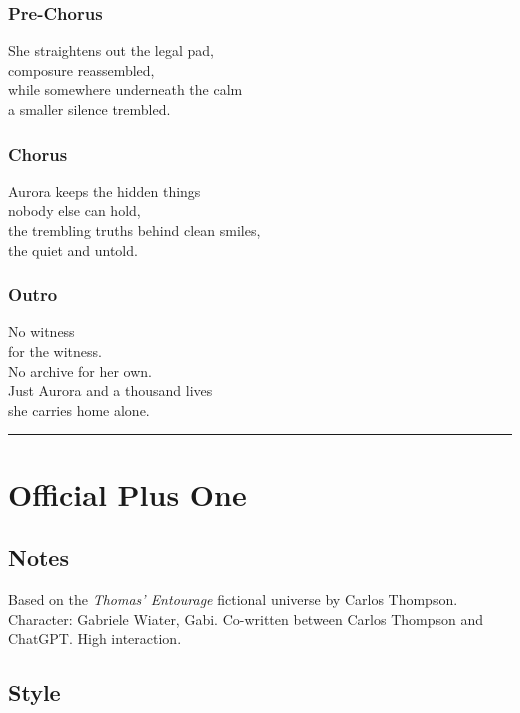 \subsubsection{Pre-Chorus}\label{pre-chorus-16}

She straightens out the legal pad,\\
composure reassembled,\\
while somewhere underneath the calm\\
a smaller silence trembled.

\subsubsection{Chorus}\label{chorus-26}

Aurora keeps the hidden things\\
nobody else can hold,\\
the trembling truths behind clean smiles,\\
the quiet and untold.

\subsubsection{Outro}\label{outro-2}

No witness\\
for the witness.\\
No archive for her own.\\
Just Aurora and a thousand lives\\
she carries home alone.

\begin{center}\rule{0.5\linewidth}{0.5pt}\end{center}

\section{Official Plus One}\label{official-plus-one}

\subsection{Notes}\label{notes-13}

Based on the \emph{Thomas' Entourage} fictional universe by Carlos
Thompson. Character: Gabriele Wiater, Gabi. Co-written between Carlos
Thompson and ChatGPT. High interaction.

\subsection{Style}\label{style-12}


